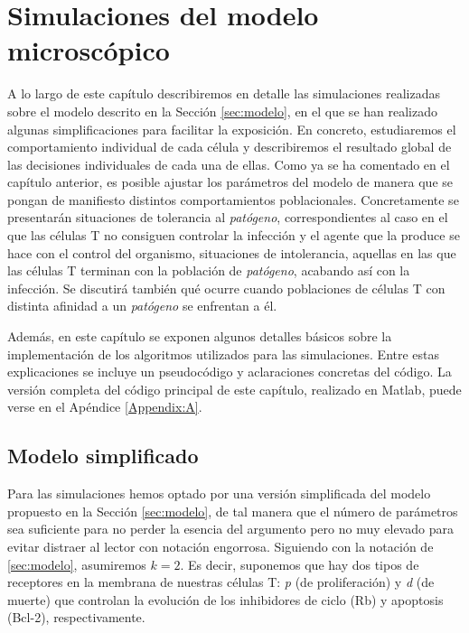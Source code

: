 
\chapter{Simulaciones del modelo microscópico}
\label{cap:simulaciones}

A lo largo de este capítulo describiremos en detalle las simulaciones realizadas sobre el modelo descrito en la Sección \ref{sec:modelo}, en el que se han realizado algunas simplificaciones para facilitar la exposición. En concreto, estudiaremos el comportamiento individual de cada célula y describiremos el resultado global de las decisiones individuales de cada una de ellas. Como ya se ha comentado en el capítulo anterior, es posible ajustar los parámetros del modelo de manera que se  pongan de manifiesto distintos comportamientos poblacionales. Concretamente se presentarán situaciones de tolerancia al \textit{patógeno}, correspondientes al caso en el que las células T no consiguen controlar la infección y el agente que la produce se hace con el control del organismo, situaciones de intolerancia, aquellas en las que las células T terminan con la población de \textit{patógeno}, acabando así con la infección. Se discutirá también qué ocurre cuando  poblaciones de células T con distinta afinidad a un \textit{patógeno} se enfrentan a él.

Además, en este capítulo se exponen algunos detalles básicos sobre la implementación de los algoritmos utilizados para las simulaciones. Entre estas explicaciones se incluye un pseudocódigo y aclaraciones concretas del código. La versión completa del código principal de este capítulo, realizado en Matlab, puede verse en el Apéndice \ref{Appendix:A}. 
 

\section{Modelo simplificado}

Para las simulaciones hemos optado por una versión simplificada del modelo propuesto en la Sección \ref{sec:modelo}, de tal manera que el número de parámetros sea suficiente para no perder la esencia del argumento pero no muy elevado para evitar distraer al lector con notación engorrosa. Siguiendo con la notación de \ref{sec:modelo}, asumiremos $k=2$. Es decir, suponemos que hay dos tipos de receptores en la membrana de nuestras células T: \textit{p} (de proliferación) y \textit{d} (de muerte) que controlan la evolución de los inhibidores de ciclo (Rb) y apoptosis (Bcl-2), respectivamente.

